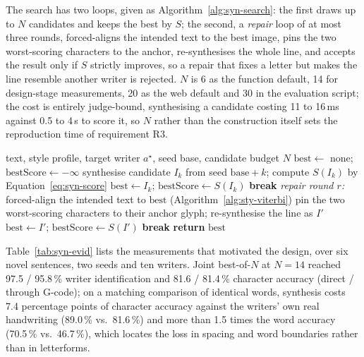 The search has two loops, given as Algorithm~\ref{alg:syn-search}: the first draws up to $N$ candidates and keeps the best by $S$; the second, a \emph{repair} loop of at most three rounds, forced-aligns the intended text to the best image, pins the two worst-scoring characters to the anchor, re-synthesises the whole line, and accepts the result only if $S$ strictly improves, so a repair that fixes a letter but makes the line resemble another writer is rejected. $N$ is 6 as the function default, 14 for design-stage measurements, 20 as the web default and 30 in the evaluation script; the cost is entirely judge-bound, synthesising a candidate costing 11 to 16\,ms against 0.5 to 4\,s to score it, so $N$ rather than the construction itself sets the reproduction time of requirement R3.

\begin{algorithm}[!htbp]
\caption{\texttt{SynthesizeJointBestOf}: candidate search with joint scoring and repair}
\label{alg:syn-search}
\begin{algorithmic}[1]
\REQUIRE text, style profile, target writer $a^\star$, seed base, candidate budget $N$
\STATE $\mathrm{best}\leftarrow$ none; $\mathrm{bestScore}\leftarrow-\infty$
    \STATE synthesise candidate $I_k$ from seed $\mathrm{base}+k$; compute $S(I_k)$ by Equation~\ref{eq:syn-score}
        \STATE $\mathrm{best}\leftarrow I_k$; $\mathrm{bestScore}\leftarrow S(I_k)$
    \ENDIF
        \STATE \textbf{break} 
    \ENDIF
\ENDFOR
{}
    \STATE \emph{repair round $r$:} forced-align the intended text to $\mathrm{best}$ (Algorithm~\ref{alg:sty-viterbi})
    \STATE pin the two worst-scoring characters to their anchor glyph; re-synthesise the line as $I'$
        \STATE $\mathrm{best}\leftarrow I'$; $\mathrm{bestScore}\leftarrow S(I')$
    \ELSE
        \STATE \textbf{break} 
    \ENDIF
\ENDFOR
\STATE \textbf{return} $\mathrm{best}$
\end{algorithmic}
\end{algorithm}

Table~\ref{tab:syn-evid} lists the measurements that motivated the design, over six novel sentences, two seeds and ten writers. Joint best-of-$N$ at $N=14$ reached 97.5 / 95.8\,\% writer identification and 81.6 / 81.4\,\% character accuracy (direct / through G-code); on a matching comparison of identical words, synthesis costs 7.4 percentage points of character accuracy against the writers' own real handwriting (89.0\,\% vs.\ 81.6\,\%) and more than 1.5 times the word accuracy (70.5\,\% vs.\ 46.7\,\%), which locates the loss in spacing and word boundaries rather than in letterforms.

